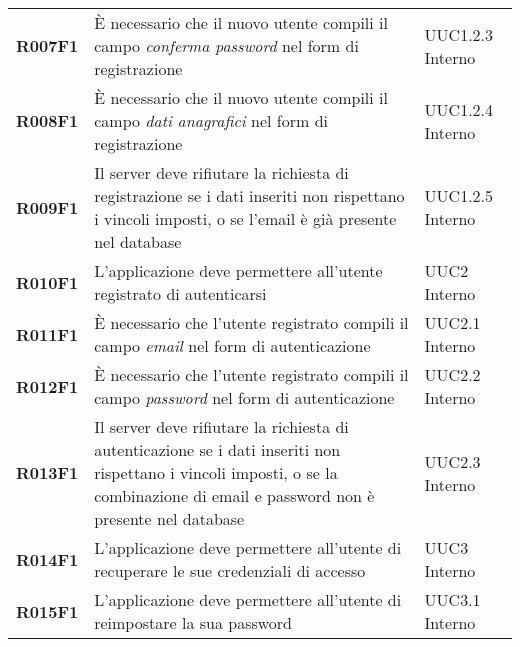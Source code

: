 \documentclass[../analisi-dei-requisiti.tex]{subfiles}
\begin{document}
\begin{longtable}[H]{>{\centering\bfseries}m{3cm} >{\centering}m{10cm} >{\centering\arraybackslash}m{3cm}}
  R007F1                               & È necessario che il nuovo utente compili il campo \textit{conferma password} nel form di registrazione                                                                                                  & UUC1.2.3 Interno              \\
  R008F1                               & È necessario che il nuovo utente compili il campo \textit{dati anagrafici} nel form di registrazione                                                                                                    & UUC1.2.4 Interno              \\
  R009F1                               & Il server deve rifiutare la richiesta di registrazione se i dati inseriti non rispettano i vincoli imposti, o se l'email è già presente nel database                                                    & UUC1.2.5 Interno              \\
  R010F1                               & L'applicazione deve permettere all'utente registrato di autenticarsi                                                                                                                                    & UUC2 Interno                  \\
  R011F1                               & È necessario che l'utente registrato compili il campo \textit{email} nel form di autenticazione                                                                                                         & UUC2.1 Interno                \\
  R012F1                               & È necessario che l'utente registrato compili il campo \textit{password} nel form di autenticazione                                                                                                      & UUC2.2 Interno                \\
  R013F1                               & Il server deve rifiutare la richiesta di autenticazione se i dati inseriti non rispettano i vincoli imposti, o se la combinazione di email e password non è presente nel database                       & UUC2.3 Interno                \\
  R014F1                               & L'applicazione deve permettere all'utente di recuperare le sue credenziali di accesso                                                                                                                   & UUC3 Interno                  \\
  R015F1                               & L'applicazione deve permettere all'utente di reimpostare la sua password                                                                                                                                & UUC3.1 Interno                \\

\end{longtable}
\end{document}
